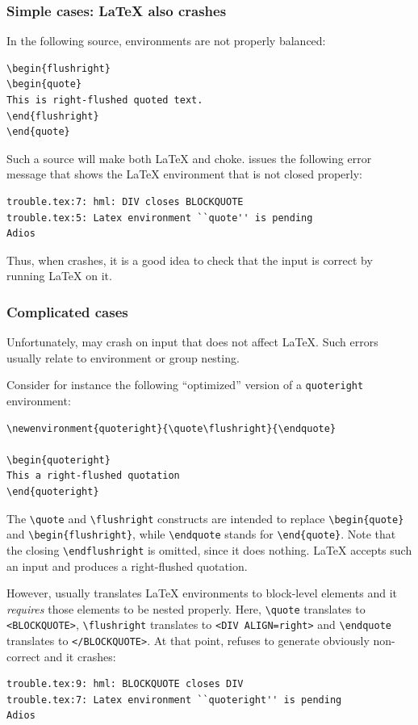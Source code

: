 \subsubsection{Simple cases: \LaTeX{} also crashes}
In  the following source, environments are not properly balanced:
\begin{verbatim}
\begin{flushright}
\begin{quote}
This is right-flushed quoted text.
\end{flushright}
\end{quote}
\end{verbatim}
Such a source will make both \LaTeX{} and \hevea{} choke.
\hevea{} issues the following error message that shows the \LaTeX{}
environment that is not closed properly:
\begin{verbatim}
trouble.tex:7: hml: DIV closes BLOCKQUOTE
trouble.tex:5: Latex environment ``quote'' is pending
Adios
\end{verbatim}
Thus, when \hevea{} crashes, it is a good idea to check that the
input is correct by running \LaTeX{} on it.

\subsubsection{Complicated cases}

Unfortunately, \hevea{} may crash on input that does not affect
\LaTeX.
Such errors usually relate to environment or group nesting.

Consider for instance the following ``optimized'' version of a
\verb+quoteright+  environment:
\begin{verbatim}
\newenvironment{quoteright}{\quote\flushright}{\endquote}

\begin{quoteright}
This a right-flushed quotation
\end{quoteright}
\end{verbatim}

The \verb+\quote+ and \verb+\flushright+ constructs
are intended to replace
\verb+\begin{quote}+ and \verb+\begin{flushright}+,
while \verb+\endquote+ stands for \verb+\end{quote}+.
Note that the closing \verb+\endflushright+
is omitted, since it does nothing.
\LaTeX{} accepts such an input and produces a  right-flushed quotation.

However,  \hevea{} usually translates \LaTeX{} environments  to \html{}
block-level elements and it \emph{requires}
those elements to be nested properly.
Here, \verb+\quote+ translates to \verb+<BLOCKQUOTE>+,
\verb+\flushright+ translates to \verb+<DIV ALIGN=right>+ and
\verb+\endquote+ translates to \verb+</BLOCKQUOTE>+.
At that point, \hevea{} refuses to generate obviously
non-correct {\html} and it crashes:
\begin{verbatim}
trouble.tex:9: hml: BLOCKQUOTE closes DIV
trouble.tex:7: Latex environment ``quoteright'' is pending
Adios
\end{verbatim}

